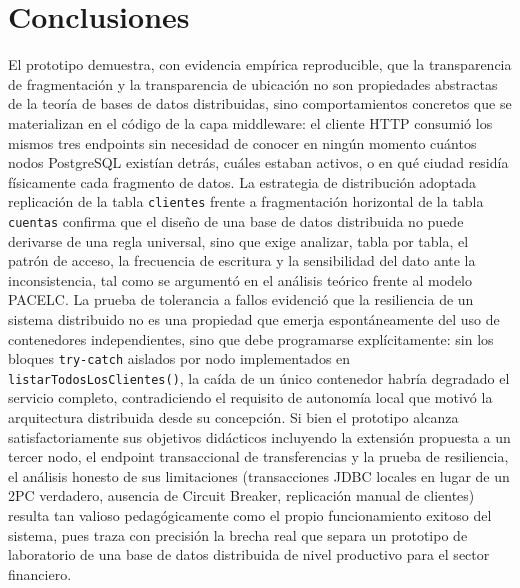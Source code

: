 \documentclass[11pt,a4paper]{article}
\begin{document}
\section{Conclusiones}

\begin{enumerate}[leftmargin=1.4em]
  El prototipo demuestra, con evidencia empírica reproducible, que la transparencia de fragmentación y la transparencia de ubicación no son propiedades abstractas de la teoría de bases de datos distribuidas, sino comportamientos concretos que se materializan en el código de la capa middleware: el cliente HTTP consumió los mismos tres endpoints sin necesidad de conocer en ningún momento cuántos nodos PostgreSQL existían detrás, cuáles estaban activos, o en qué ciudad residía físicamente cada fragmento de datos.
  La estrategia de distribución adoptada replicación de la tabla \texttt{clientes} frente a fragmentación horizontal de la tabla \texttt{cuentas} confirma que el diseño de una base de datos distribuida no puede derivarse de una regla universal, sino que exige analizar, tabla por tabla, el patrón de acceso, la frecuencia de escritura y la sensibilidad del dato ante la inconsistencia, tal como se argumentó en el análisis teórico frente al modelo PACELC.
  La prueba de tolerancia a fallos evidenció que la resiliencia de un sistema distribuido no es una propiedad que emerja espontáneamente del uso de contenedores independientes, sino que debe programarse explícitamente: sin los bloques \texttt{try-catch} aislados por nodo implementados en \texttt{listarTodosLosClientes()}, la caída de un único contenedor habría degradado el servicio completo, contradiciendo el requisito de autonomía local que motivó la arquitectura distribuida desde su concepción.
  Si bien el prototipo alcanza satisfactoriamente sus objetivos didácticos incluyendo la extensión propuesta a un tercer nodo, el endpoint transaccional de transferencias y la prueba de resiliencia, el análisis honesto de sus limitaciones (transacciones JDBC locales en lugar de un 2PC verdadero, ausencia de Circuit Breaker, replicación manual de clientes) resulta tan valioso pedagógicamente como el propio funcionamiento exitoso del sistema, pues traza con precisión la brecha real que separa un prototipo de laboratorio de una base de datos distribuida de nivel productivo para el sector financiero.
\end{enumerate}
\end{document}
